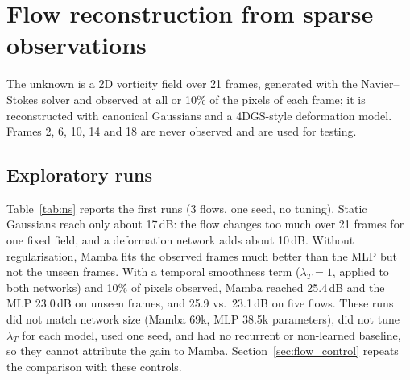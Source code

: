 \section{Flow reconstruction from sparse observations}
\label{sec:flow}
The unknown is a 2D vorticity field over 21 frames, generated with the Navier--Stokes solver and observed at all or
10\% of the pixels of each frame; it is reconstructed with canonical Gaussians and a 4DGS-style deformation model.
Frames 2, 6, 10, 14 and 18 are never observed and are used for testing.

\subsection{Exploratory runs}
Table~\ref{tab:ns} reports the first runs (3 flows, one seed, no tuning). Static Gaussians reach only about 17\,dB:
the flow changes too much over 21 frames for one fixed field, and a deformation network adds about 10\,dB. Without
regularisation, Mamba fits the observed frames much better than the MLP but not the unseen frames. With a temporal
smoothness term ($\lambda_T=1$, applied to both networks) and 10\% of pixels observed, Mamba reached 25.4\,dB and the
MLP 23.0\,dB on unseen frames, and 25.9 vs.\ 23.1\,dB on five flows. These runs did not match network size (Mamba
69k, MLP 38.5k parameters), did not tune $\lambda_T$ for each model, used one seed, and had no recurrent or non-learned
baseline, so they cannot attribute the gain to Mamba. Section~\ref{sec:flow_control} repeats the comparison with
these controls.

\begin{table}[htbp]
  \centering
  \caption{Exploratory runs (3 flows, one seed, $\lambda_T$ not tuned): PSNR (dB) on unseen frames, observed-frame
  PSNR in brackets. ``+ smooth'' = temporal smoothness $\lambda_T=1$ for every network.}
  \label{tab:ns}
\end{table}

